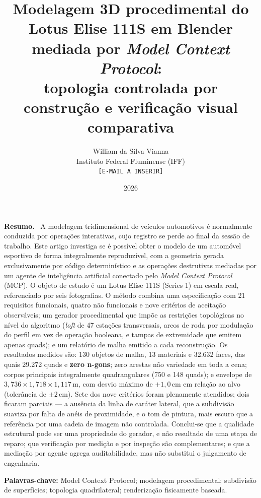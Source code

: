 \documentclass[10pt,a4paper]{article}
\title{\bfseries Modelagem 3D procedimental do Lotus Elise 111S em Blender
mediada por \emph{Model Context Protocol}:\\ topologia controlada por
constru\c{c}\~ao e verifica\c{c}\~ao visual comparativa}
\author{William da Silva Vianna\\
\normalsize Instituto Federal Fluminense (IFF)\\
\normalsize \texttt{[E-MAIL A INSERIR]}}
\date{2026}
\newenvironment{resumo}
  {\par\vspace{4pt}\begin{center}\begin{minipage}{0.92\textwidth}\small\noindent\textbf{Resumo.}\ \ignorespaces}
  {\end{minipage}\end{center}\par}
\newcommand{\palavraschave}[1]{\par\vspace{2pt}\begin{center}\begin{minipage}{0.92\textwidth}\small\noindent\textbf{Palavras-chave:} #1\end{minipage}\end{center}\par\vspace{8pt}}
\begin{document}
\frenchspacing
\maketitle
\thispagestyle{empty}

\begin{resumo}
A modelagem tridimensional de ve\'iculos automotivos \'e normalmente conduzida por
opera\c{c}\~oes interativas, cujo registro se perde ao final da sess\~ao de trabalho. Este
artigo investiga se \'e poss\'ivel obter o modelo de um autom\'ovel esportivo de forma
integralmente reproduz\'ivel, com a geometria gerada exclusivamente por c\'odigo
determin\'istico e as opera\c{c}\~oes destrutivas mediadas por um agente de
intelig\^encia artificial conectado pelo \emph{Model Context Protocol} (MCP). O objeto de
estudo \'e um Lotus Elise 111S (Series 1) em escala real, referenciado por seis
fotografias. O m\'etodo combina uma especifica\c{c}\~ao com 21 requisitos funcionais,
quatro n\~ao funcionais e nove crit\'erios de aceita\c{c}\~ao observ\'aveis; um gerador
procedimental que imp\~oe as restri\c{c}\~oes topol\'ogicas no n\'ivel do algoritmo
(\emph{loft} de 47 esta\c{c}\~oes transversais, arcos de roda por modula\c{c}\~ao do
perfil em vez de opera\c{c}\~ao booleana, e tampas de extremidade que emitem apenas quads);
e um relat\'orio de malha emitido a cada reconstru\c{c}\~ao. Os resultados medidos s\~ao:
130 objetos de malha, 13 materiais e 32.632 faces, das quais 29.272 quads e \textbf{zero
n-gons}; zero arestas n\~ao variedade em toda a cena; corpos principais integralmente
quadrangulares (750 e 148 quads); e envelope de
$3{,}736 \times 1{,}718 \times 1{,}117$\,m, com desvio m\'aximo de $+1{,}0$\,cm em
rela\c{c}\~ao ao alvo (toler\^ancia de $\pm2$\,cm). Sete dos nove crit\'erios foram
plenamente atendidos; dois ficaram parciais --- a aus\^encia da linha de car\'ater lateral,
que a subdivis\~ao suaviza por falta de an\'eis de proximidade, e o tom de pintura, mais
escuro que a refer\^encia por uma cadeia de imagem n\~ao controlada. Conclui-se que a
qualidade estrutural pode ser uma propriedade do gerador, e n\~ao resultado de uma etapa de
reparo; que verifica\c{c}\~ao por medi\c{c}\~ao e por inspe\c{c}\~ao s\~ao complementares;
e que a media\c{c}\~ao por agente agrega auditabilidade, mas n\~ao substitui o julgamento de
engenharia.
\end{resumo}
\palavraschave{Model Context Protocol; modelagem procedimental; subdivis\~ao de
superf\'icies; topologia quadrilateral; renderiza\c{c}\~ao fisicamente baseada.}
\end{document}
